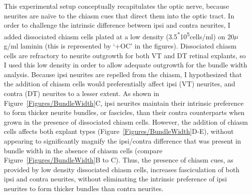 This experimental setup conceptually recapitulates the optic nerve, because neurites are na\"ive to the chiasm cues that direct them into the optic tract.
In order to challenge the intrinsic difference between ipsi and contra neurites, I added dissociated chiasm cells plated at a low density (3.5\textsuperscript{*}10\textsuperscript{5}cells/ml) on 20$\mu$g/ml laminin (this is represented by `+OC' in the figures).
Dissociated chiasm cells are refractory to neurite outgrowth for both VT and DT retinal explants, so I used this low density in order to allow adequate outgrowth for the bundle width analysis.
Because ipsi neurites are repelled from the chiasm, I hypothesized that the addition of chiasm cells would preferentially affect ipsi (VT) neurites, and contra (DT) neurites to a lesser extent.
As shown in Figure~\ref{Figures/BundleWidth}C, ipsi neurites maintain their intrinsic preference to form thicker neurite bundles, or fascicles, than their contra counterparts when grown in the presence of dissociated chiasm cells.
However, the addition of chiasm cells affects both explant types (Figure~\ref{Figures/BundleWidth}D-E), without appearing to significantly magnify the ipsi/contra difference that was present in bundle width in the absence of chiasm cells (compare Figure~\ref{Figures/BundleWidth}B to C).
Thus, the presence of chiasm cues, as provided by low density dissociated chiasm cells, increases fasciculation of both ipsi and contra neurites, without eliminating the intrinsic preference of ipsi neurites to form thicker bundles than contra neurites.

